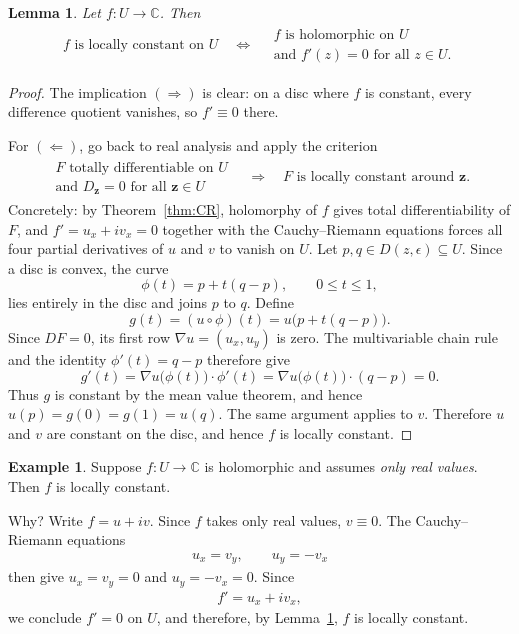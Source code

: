 \documentclass[11pt]{article}
\theoremstyle{plain}
\newtheorem{lemma}[theorem]{Lemma}
\theoremstyle{definition}
\newtheorem{example}[theorem]{Example}
\theoremstyle{remark}
\numberwithin{equation}{section}
\newcommand{\be}{\begin{eqnarray}}
\newcommand{\ee}{\end{eqnarray}}
\newcommand{\C}{\mathbb{C}}
\newcommand{\zz}{\mathbf z}
\begin{document}
\begin{lemma}
\label{lem:loc-const}
Let $f:U\to\C$. Then
\be
 f\text{ is locally constant on }U
 \quad\Longleftrightarrow\quad
 \begin{array}{c}
 f\text{ is holomorphic on }U\\
 \text{and }f'(z)=0\text{ for all }z\in U.
 \end{array}
\ee
\end{lemma}

\begin{proof}
The implication $(\Longrightarrow)$ is clear: on a disc where $f$ is
constant, every difference quotient vanishes, so $f'\equiv0$ there.

For $(\Longleftarrow)$, go back to real analysis and apply the criterion
\be
 \begin{array}{c}
 F\text{ totally differentiable on }U\\
 \text{and }D_{\zz}=0\text{ for all }\zz\in U
 \end{array}
 \quad\Longrightarrow\quad
 F\text{ is locally constant around }\zz.
\ee
Concretely: by Theorem~\ref{thm:CR}, holomorphy of $f$ gives total
differentiability of $F$, and $f'=u_x+iv_x=0$ together with the
Cauchy--Riemann equations forces all four partial derivatives of $u$ and
$v$ to vanish on $U$. Let $p,q\in D(z,\epsilon)\subseteq U$. Since a disc
is convex, the curve
\[
 \phi(t)=p+t(q-p),\qquad 0\le t\le1,
\]
lies entirely in the disc and joins $p$ to $q$. Define
\[
 g(t)=(u\circ\phi)(t)=u\bigl(p+t(q-p)\bigr).
\]
Since $DF=0$, its first row $\nabla u=(u_x,u_y)$ is zero. The multivariable
chain rule and the identity $\phi'(t)=q-p$ therefore give
\[
 g'(t)=\nabla u\bigl(\phi(t)\bigr)\cdot\phi'(t)
      =\nabla u\bigl(\phi(t)\bigr)\cdot(q-p)=0.
\]
Thus $g$ is constant by the mean value theorem, and hence
$u(p)=g(0)=g(1)=u(q)$. The same argument applies to $v$. Therefore $u$ and
$v$ are constant on the disc, and hence $f$ is locally constant.
\end{proof}

\begin{example}
Suppose $f:U\to\C$ is holomorphic and assumes \emph{only real values}.
Then $f$ is locally constant.

Why? Write $f=u+iv$. Since $f$ takes only real values, $v\equiv0$. The
Cauchy--Riemann equations
\be
 u_x=v_y,\qquad u_y=-v_x
\ee
then give $u_x=v_y=0$ and $u_y=-v_x=0$. Since
\be
 f'=u_x+iv_x,
\ee
we conclude $f'=0$ on $U$, and therefore, by Lemma~\ref{lem:loc-const},
$f$ is locally constant.
\end{example}
\end{document}

